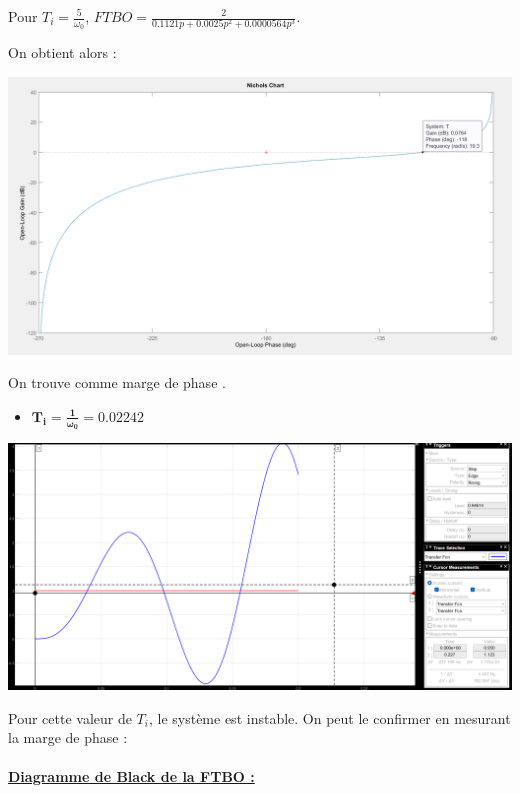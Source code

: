 \documentclass[12pt]{article}
\begin{document}
\begin{center}
    \normalsize Pour $T_i = \frac{5}{\omega_0}$, \large $FTBO = \frac{2}{0.1121p + 0.0025p^2 + 0.0000564p^3}$.
\end{center}
\newpage
\normalsize On obtient alors :
\begin{center}
    \includegraphics[width = 19 cm]{TP2 Simulink/Syst_2/nichols_4.2_Ti=5_sur_omega0.png}
\end{center}
On trouve comme marge de phase .
\newpage
\begin{itemize}
    \item \large $\mathbf{T_i = \frac{1}{\omega_0} = 0.02242}$
\end{itemize}
\begin{center}
    \includegraphics[width = 19 cm]{TP2 Simulink/Syst_2/4.2_instable_Ti=1_sur_omega0.png}


\end{center}
Pour cette valeur de $T_i$, le système est instable. On peut le confirmer en mesurant la marge de phase :
\\\\\underline{\bf Diagramme de Black de la FTBO :}
\end{document}
